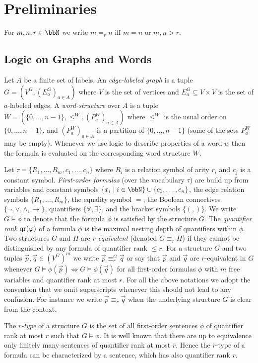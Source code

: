 \section{Preliminaries}
For $m,n,r\in\bbN$ we write $m =_r n$ iff $m=n$ or $m,n>r$.

\subsection{Logic on Graphs and Words}
Let $A$ be a finite set of labels. An \emph{edge-labeled graph} is a tuple $G=(V^G,(E_a^G)_{a\in A})$ where $V$ is the set of vertices and $E_a^G \subseteq V\times V$ is the set of $a$-labeled edges. 
A \emph{word-structure} over $A$ is a tuple $W = (\{0,\ldots, n-1\}, \leq^W, (P_a^W)_{a\in A})$ where $\leq^W$ is the usual order on $\{0,\ldots,n-1\}$, and $(P_a^W)_{a\in A}$ is a partition of $\{0,\ldots, n-1\}$ (some of the sets $P_a^W$ may be empty). Whenever we use logic to describe properties of a word $w$ then the formula is evaluated on the corresponding word structure $W$. 

Let $\tau = \{R_1,\ldots,R_m, c_1, \ldots, c_n\}$ where $R_i$ is a relation symbol of arity $r_i$ and $c_j$ is a constant symbol.
\emph{First-order formulas} (over the vocabulary $\tau$) are build up
from variables and constant symbols $\{x_i \mid i\in \bbN \}\cup \{c_1,\ldots,c_n\}$, the edge relation symbols $\{R_1,\ldots, R_m\}$, the equality symbol $=$, the Boolean connectives
$\{\lnot,\vee,\wedge, \to \}$,
quantifiers $\{\forall, \exists \}$, and the bracket symbols
$\{(,) \}$. 
We write $G\models \phi$ to denote that the formula $\phi$ is satisfied by the structure $G$.
The \emph{quantifier rank} $\operatorname{qr}(\varphi)$ of a formula $\phi$
is the maximal nesting depth of quantifiers within $\phi$. Two structures
$G$ and $H$ are \emph{$r$-equivalent} (denoted $G\equiv_r H$) if they
cannot be distinguished by any formula of quantifier rank $\le r$. 
For a structure $G$ and two tuples $\vec{p}, \vec{q} \in (V^G)^m$ we write $\vec{p} \equiv_r^G \vec{q}$ or say that $\vec{p}$ and $\vec{q}$ are $r$-equivalent in $G$
whenever $G\models \phi(\vec{p}) \Leftrightarrow G\models\phi(\vec{q})$ for all first-order formulas $\phi$ with $m$ free variables and
quantifier rank at most $r$. For all the above notations we adopt the convention that we omit superscripts whenever this should not lead to any confusion. For instance we write 
$\vec{p} \equiv_r \vec{q}$ when the underlying structure $G$ is clear from the context. 

The \emph{$r$-type} of a structure $G$ is the set of all first-order sentences $\phi$ of quantifier rank at most $r$ such that $G\models \phi$. It is well known that there are up to equivalence only
finitely many sentences of quantifier rank at most $r$. Hence the $r$-type of a formula can be characterized by a sentence, which has also quantifier rank $r$. 

